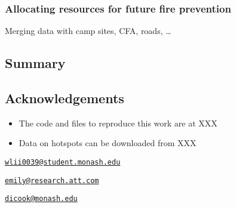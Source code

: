 \hypertarget{allocating-resources-for-future-fire-prevention}{%
\subsubsection{Allocating resources for future fire
prevention}\label{allocating-resources-for-future-fire-prevention}}

Merging data with camp sites, CFA, roads, \ldots{}

\hypertarget{summary}{%
\subsection{Summary}\label{summary}}

\hypertarget{acknowledgements}{%
\subsection{Acknowledgements}\label{acknowledgements}}

\begin{itemize}
\tightlist
\item
  The code and files to reproduce this work are at XXX
\item
  Data on hotspots can be downloaded from XXX
\end{itemize}




\address{%
Weihao Li\\
Monash University\\
line 1\\ line 2\\
}
\href{mailto:wlii0039@student.monash.edu}{\nolinkurl{wlii0039@student.monash.edu}}

\address{%
Emily Dodwell\\
AT\&T\\
line 1\\ line 2\\
}
\href{mailto:emily@research.att.com}{\nolinkurl{emily@research.att.com}}

\address{%
Dianne Cook\\
Monash University\\
line 1\\ line 2\\
}
\href{mailto:dicook@monash.edu}{\nolinkurl{dicook@monash.edu}}

